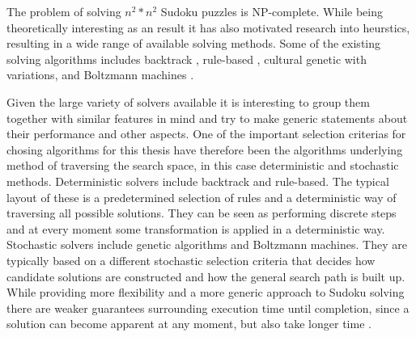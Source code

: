 \documentclass[a4paper,11pt]{kth-mag}
\begin{document}
The problem of solving $n^2 * n^2$ Sudoku puzzles is NP-complete.\cite{complexity}
While being theoretically interesting as an result it has also motivated research into heurstics, resulting in a wide range of available solving methods.
Some of the existing solving algorithms includes backtrack \cite{searchBased}, rule-based \cite{techniques}, cultural genetic with variations\cite{stochastic}, and Boltzmann machines \cite{boltzmann}.

Given the large variety of solvers available it is interesting to group them together with similar features in mind and try to make generic statements about their performance and other aspects.
One of the important selection criterias for chosing algorithms for this thesis have therefore been the algorithms underlying method of traversing the search space, in this case deterministic and stochastic methods.
Deterministic solvers include backtrack and rule-based.
The typical layout of these is a predetermined selection of rules and a deterministic way of traversing all possible solutions.
They can be seen as performing discrete steps and at every moment some transformation is applied in a deterministic way.
Stochastic solvers include genetic algorithms and Boltzmann machines.
They are typically based on a different stochastic selection criteria that decides how candidate solutions are constructed and how the general search path is built up.
While providing more flexibility and a more generic approach to Sudoku solving there are weaker guarantees surrounding execution time until completion, since a solution can become apparent at any moment, but also take longer time \cite{stochastic}.

\FloatBarrier
\end{document}
